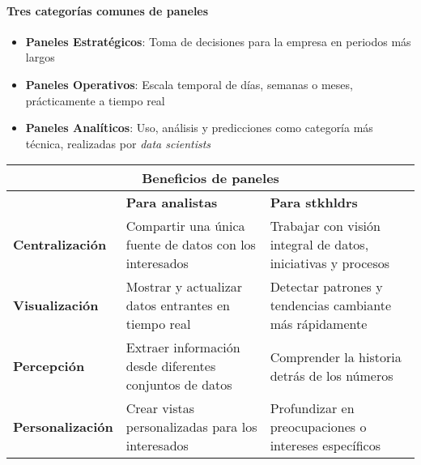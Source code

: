 \paragraph{Tres categorías comunes de paneles}
    \begin{itemize}
        \item {\textbf{Paneles Estratégicos}: Toma de decisiones para la empresa en periodos más largos}
        \item {\textbf{Paneles Operativos}: Escala temporal de días, semanas o meses, prácticamente a tiempo real}
        \item {\textbf{Paneles Analíticos}: Uso, análisis y predicciones como categoría más técnica, realizadas por \textit{data scientists}}
    \end{itemize}
\begin{table}
    \centering
    \begin{tabular}{|p{2.9cm}|p{5.4cm}|p{5.5cm}|}
        \hline
        \multicolumn{3}{|c|}{Beneficios de paneles} \\
        \hline
        & \textbf{Para analistas} & \textbf{Para \Gls{stkhldrs}} \\
        \hline
        \small{\textbf{Centralización}} & Compartir una única fuente de datos con los interesados & Trabajar con visión integral de datos, iniciativas y procesos \\
        \hline
        \small{\textbf{Visualización}} & Mostrar y actualizar datos \break entrantes en tiempo real & Detectar patrones y tendencias cambiante más rápidamente \\
        \hline
         \small{\textbf{Percepción}} & Extraer información desde \break diferentes conjuntos de datos & Comprender la historia detrás de los números \\
        \hline
        \small{\textbf{Personalización}} & Crear vistas personalizadas para los interesados & Profundizar en preocupaciones o intereses específicos \\
        \hline
    \end{tabular}
\end{table}

